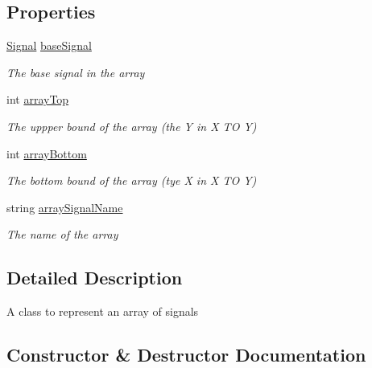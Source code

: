 \subsection*{Properties}
\begin{DoxyCompactItemize}
\item 
\hyperlink{class_n_n_gen_1_1_signal}{Signal} \hyperlink{class_n_n_gen_1_1_array_signal_ac02aec9002f01b76184bf49356e73671}{base\+Signal}
\begin{DoxyCompactList}\small\item\em The base signal in the array \end{DoxyCompactList}\item 
int \hyperlink{class_n_n_gen_1_1_array_signal_ae5f4cbd20b0ff287422320175a949037}{array\+Top}
\begin{DoxyCompactList}\small\item\em The uppper bound of the array (the Y in X T\+O Y) \end{DoxyCompactList}\item 
int \hyperlink{class_n_n_gen_1_1_array_signal_a0c96b2bc754f75aa96537c52ba9d13d1}{array\+Bottom}
\begin{DoxyCompactList}\small\item\em The bottom bound of the array (tye X in X T\+O Y) \end{DoxyCompactList}\item 
string \hyperlink{class_n_n_gen_1_1_array_signal_aab7a2cc15c50394e6f6a6085ce467762}{array\+Signal\+Name}
\begin{DoxyCompactList}\small\item\em The name of the array \end{DoxyCompactList}\end{DoxyCompactItemize}


\subsection{Detailed Description}
A class to represent an array of signals 



\subsection{Constructor \& Destructor Documentation}
\hypertarget{class_n_n_gen_1_1_array_signal_aee5e895b62756957e013e2993b39ca63}{}

